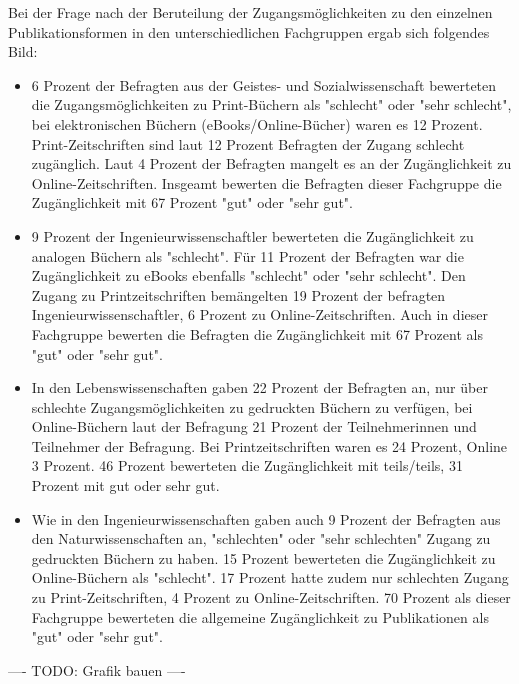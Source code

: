 Bei der Frage nach der Beruteilung der Zugangsmöglichkeiten zu den einzelnen Publikationsformen in den unterschiedlichen Fachgruppen ergab sich folgendes Bild:
\begin{itemize}
\item 6 Prozent der Befragten aus der Geistes- und Sozialwissenschaft bewerteten die Zugangsmöglichkeiten zu Print-Büchern als "schlecht" oder "sehr schlecht", bei elektronischen Büchern (eBooks/Online-Bücher) waren es 12 Prozent. Print-Zeitschriften sind laut 12 Prozent Befragten der Zugang schlecht zugänglich. Laut 4 Prozent der Befragten mangelt es an der Zugänglichkeit zu Online-Zeitschriften. Insgeamt bewerten die Befragten dieser Fachgruppe die Zugänglichkeit mit 67 Prozent "gut" oder "sehr gut".
\item 9 Prozent der Ingenieurwissenschaftler bewerteten die Zugänglichkeit zu analogen Büchern als "schlecht". Für 11 Prozent der Befragten war die Zugänglichkeit zu eBooks ebenfalls "schlecht" oder "sehr schlecht". Den Zugang zu Printzeitschriften bemängelten 19 Prozent der befragten Ingenieurwissenschaftler, 6 Prozent zu Online-Zeitschriften. Auch in dieser Fachgruppe bewerten die Befragten die Zugänglichkeit mit 67 Prozent als "gut" oder "sehr gut".
\item In den Lebenswissenschaften gaben 22 Prozent der Befragten an, nur über schlechte Zugangsmöglichkeiten zu gedruckten Büchern zu verfügen, bei Online-Büchern laut der Befragung 21 Prozent der Teilnehmerinnen und Teilnehmer der Befragung. Bei Printzeitschriften waren es 24 Prozent, Online 3 Prozent. 46 Prozent bewerteten die Zugänglichkeit mit teils/teils, 31 Prozent mit gut oder sehr gut.
\item Wie in den Ingenieurwissenschaften gaben auch 9 Prozent der Befragten aus den Naturwissenschaften an, "schlechten" oder "sehr schlechten" Zugang zu gedruckten Büchern zu haben. 15 Prozent bewerteten die Zugänglichkeit zu Online-Büchern als "schlecht". 17 Prozent hatte zudem nur schlechten Zugang zu Print-Zeitschriften, 4 Prozent zu Online-Zeitschriften. 70 Prozent als dieser Fachgruppe bewerteten die allgemeine Zugänglichkeit zu Publikationen als "gut" oder "sehr gut".
\end{itemize}

---- TODO: Grafik bauen ----

